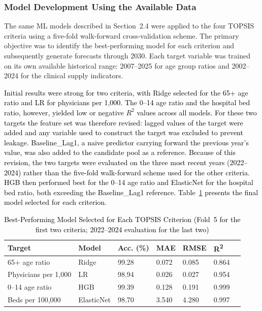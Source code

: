 \documentclass[final, 9pt, twocolumn]{saucis}
\newcommand{\rev}[1]{\textcolor{black}{#1}}
\begin{document}
\subsubsection{Model Development Using the Available Data}

The same ML models described in Section~2.4 were applied to the four TOPSIS criteria using a five-fold walk-forward cross-validation scheme. The primary objective was to identify the best-performing model for each criterion and subsequently generate forecasts through 2030. Each target variable was trained on its own available historical range: 2007--2025 for age group ratios and 2002--2024 for the clinical supply indicators.

\rev{Initial results were strong for two criteria, with Ridge selected for the
65+ age ratio and LR for physicians per 1,000. The 0--14 age ratio and the
hospital bed ratio, however, yielded low or negative $R^{2}$ values across all
models. For these two targets the feature set was therefore revised: lagged
values of the target were added and any variable used to construct the target
was excluded to prevent leakage. Baseline\_Lag1, a naive predictor carrying
forward the previous year's value, was also added to the candidate pool as a
reference. Because of this revision, the two targets were evaluated on the three
most recent years (2022--2024) rather than the five-fold walk-forward scheme
used for the other criteria. HGB then performed best for the 0--14 age ratio and
ElasticNet for the hospital bed ratio, both exceeding the Baseline\_Lag1
reference. Table~\ref{tab:topsis_model_best} presents the final model selected
for each criterion.}

\begin{table}[h]
\centering
\caption{\rev{Best-Performing Model Selected for Each TOPSIS Criterion
(Fold~5 for the first two criteria; 2022--2024 evaluation for the last two)}}
\label{tab:topsis_model_best}
\begin{tabular}{p{2cm} p{1.1cm} p{0.8cm} p{0.8cm} p{0.8cm} p{0.8cm} p{0.8cm}}
\hline
\textbf{Target} & \textbf{Model} & \textbf{Acc. (\%)} & \textbf{MAE} & \textbf{RMSE} & \textbf{R\textsuperscript{2}} \\
\hline
65+ age ratio        & Ridge                & 99.28 & 0.072  & 0.085  & 0.864 \\
Physicians per 1,000    & LR     & 98.94 & 0.026  & 0.027  & 0.954 \\
0--14 age ratio      & HGB & 99.39 & 0.128  & 0.191  & 0.999 \\
Beds per 100,000     & ElasticNet           & 98.70 & 3.540  & 4.280  & 0.997 \\
\hline
\end{tabular}
\end{table}
\end{document}
